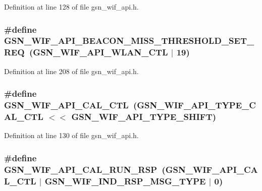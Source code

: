 Definition at line 128 of file gsn\_\-wif\_\-api.h.

\hypertarget{a00606_ae32370bb6df5ef1f64f00e2c104a8913}{
\subsubsection[{GSN\_\-WIF\_\-API\_\-BEACON\_\-MISS\_\-THRESHOLD\_\-SET\_\-REQ}]{\setlength{\rightskip}{0pt plus 5cm}\#define GSN\_\-WIF\_\-API\_\-BEACON\_\-MISS\_\-THRESHOLD\_\-SET\_\-REQ~(GSN\_\-WIF\_\-API\_\-WLAN\_\-CTL $|$ 19)}}
\label{a00606_ae32370bb6df5ef1f64f00e2c104a8913}


Definition at line 208 of file gsn\_\-wif\_\-api.h.

\hypertarget{a00606_acc0ff02b6d9aeb7c90ff1db2ef235489}{
\subsubsection[{GSN\_\-WIF\_\-API\_\-CAL\_\-CTL}]{\setlength{\rightskip}{0pt plus 5cm}\#define GSN\_\-WIF\_\-API\_\-CAL\_\-CTL~(GSN\_\-WIF\_\-API\_\-TYPE\_\-CAL\_\-CTL $<$$<$ GSN\_\-WIF\_\-API\_\-TYPE\_\-SHIFT)}}
\label{a00606_acc0ff02b6d9aeb7c90ff1db2ef235489}


Definition at line 130 of file gsn\_\-wif\_\-api.h.

\hypertarget{a00606_a337d4e3933a595d66bc47526972379af}{
\subsubsection[{GSN\_\-WIF\_\-API\_\-CAL\_\-RUN\_\-RSP}]{\setlength{\rightskip}{0pt plus 5cm}\#define GSN\_\-WIF\_\-API\_\-CAL\_\-RUN\_\-RSP~(GSN\_\-WIF\_\-API\_\-CAL\_\-CTL $|$ GSN\_\-WIF\_\-IND\_\-RSP\_\-MSG\_\-TYPE $|$ 0)}}
\label{a00606_a337d4e3933a595d66bc47526972379af}


